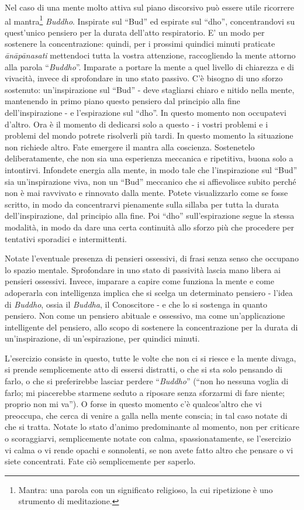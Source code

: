 
Nel caso di una mente molto attiva sul piano discorsivo può essere utile
ricorrere al mantra\footnote{Mantra: una parola con un significato religioso, la cui
ripetizione è uno strumento di meditazione.} \textit{Buddho}. Inspirate sul ``Bud'' ed espirate
sul ``dho'', concentrandovi su quest'unico pensiero per la durata
dell'atto respiratorio. E' un modo per sostenere la concentrazione:
quindi, per i prossimi quindici minuti praticate \textit{ānāpānasati} mettendoci
tutta la vostra attenzione, raccogliendo la mente attorno alla parola
``\textit{Buddho}''. Imparate a portare la mente a quel livello di chiarezza e di
vivacità, invece di sprofondare in uno stato passivo. C'è bisogno di uno
sforzo sostenuto: un'inspirazione sul ``Bud'' - deve stagliarsi chiaro e
nitido nella mente, mantenendo in primo piano questo pensiero dal
principio alla fine dell'inspirazione - e l'espirazione sul ``dho''. In
questo momento non occupatevi d'altro. Ora è il momento di dedicarsi
solo a questo - i vostri problemi e i problemi del mondo potrete
risolverli più tardi. In questo momento la situazione non richiede
altro. Fate emergere il mantra alla coscienza. Sostenetelo
deliberatamente, che non sia una esperienza meccanica e ripetitiva,
buona solo a intontirvi. Infondete energia alla mente, in modo tale che
l'inspirazione sul ``Bud'' sia un'inspirazione viva, non un ``Bud''
meccanico che si affievolisce subito perché non è mai ravvivato e
rinnovato dalla mente. Potete visualizzarlo come se fosse scritto, in
modo da concentrarvi pienamente sulla sillaba per tutta la durata
dell'inspirazione, dal principio alla fine. Poi ``dho'' sull'espirazione
segue la stessa modalità, in modo da dare una certa continuità allo
sforzo più che procedere per tentativi sporadici e intermittenti.

Notate l'eventuale presenza di pensieri ossessivi, di frasi senza senso
che occupano lo spazio mentale. Sprofondare in uno stato di passività
lascia mano libera ai pensieri ossessivi. Invece, imparare a capire come
funziona la mente e come adoperarla con intelligenza implica che si
scelga un determinato pensiero - l'idea di \textit{Buddho}, ossia il \textit{Buddha}, il
Conoscitore - e che lo si sostenga in quanto pensiero. Non come un
pensiero abituale e ossessivo, ma come un'applicazione intelligente del
pensiero, allo scopo di sostenere la concentrazione per la durata di
un'inspirazione, di un'espirazione, per quindici minuti.

L'esercizio consiste in questo, tutte le volte che non ci si riesce e la
mente divaga, si prende semplicemente atto di essersi distratti, o che
si sta solo pensando di farlo, o che si preferirebbe lasciar perdere
``\textit{Buddho}'' (``non ho nessuna voglia di farlo; mi piacerebbe starmene seduto
a riposare senza sforzarmi di fare niente; proprio non mi va''). O forse
in questo momento c'è qualcos'altro che vi preoccupa, che cerca di
venire a galla nella mente conscia; in tal caso notate di che si tratta.
Notate lo stato d'animo predominante al momento, non per criticare o
scoraggiarvi, semplicemente notate con calma, spassionatamente, se
l'esercizio vi calma o vi rende opachi e sonnolenti, se non avete fatto
altro che pensare o vi siete concentrati. Fate ciò semplicemente per
saperlo.

